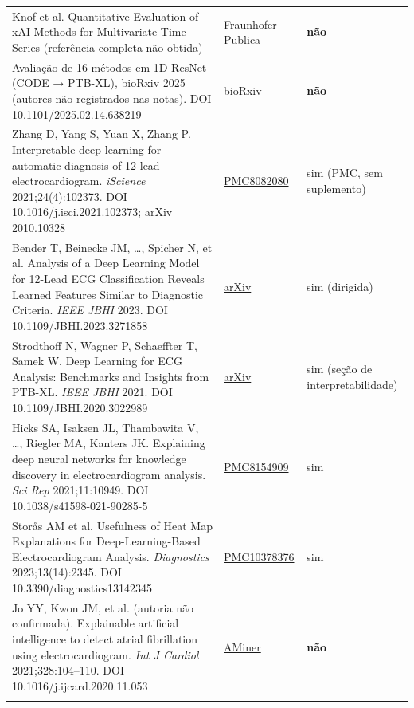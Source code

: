 \documentclass[11pt,a4paper]{article}
\begin{document}
{\begin{xltabular}{\linewidth}{>{\raggedright\arraybackslash}X>{\raggedright\arraybackslash}X>{\raggedright\arraybackslash}X}
Knof et al. Quantitative Evaluation of xAI Methods for Multivariate Time Series (referência completa não obtida) & \href{https://publica.fraunhofer.de/handle/publica/472815}{Fraunhofer Publica} & \textbf{não} \\ \addlinespace[1pt]
Avaliação de 16 métodos em 1D-ResNet (CODE → PTB-XL), bioRxiv 2025 (autores não registrados nas notas). DOI 10.1101/2025.02.14.638219 & \href{https://doi.org/10.1101/2025.02.14.638219}{bioRxiv} & \textbf{não} \\ \addlinespace[1pt]
Zhang D, Yang S, Yuan X, Zhang P. Interpretable deep learning for automatic diagnosis of 12-lead electrocardiogram. \textit{iScience} 2021;24(4):102373. DOI 10.1016/j.isci.2021.102373; arXiv 2010.10328 & \href{https://pmc.ncbi.nlm.nih.gov/articles/PMC8082080}{PMC8082080} & sim (PMC, sem suplemento) \\ \addlinespace[1pt]
Bender T, Beinecke JM, …, Spicher N, et al. Analysis of a Deep Learning Model for 12-Lead ECG Classification Reveals Learned Features Similar to Diagnostic Criteria. \textit{IEEE JBHI} 2023. DOI 10.1109/JBHI.2023.3271858 & \href{https://arxiv.org/pdf/2211.01738}{arXiv} & sim (dirigida) \\ \addlinespace[1pt]
Strodthoff N, Wagner P, Schaeffter T, Samek W. Deep Learning for ECG Analysis: Benchmarks and Insights from PTB-XL. \textit{IEEE JBHI} 2021. DOI 10.1109/JBHI.2020.3022989 & \href{https://arxiv.org/pdf/2004.13701}{arXiv} & sim (seção de interpretabilidade) \\ \addlinespace[1pt]
Hicks SA, Isaksen JL, Thambawita V, …, Riegler MA, Kanters JK. Explaining deep neural networks for knowledge discovery in electrocardiogram analysis. \textit{Sci Rep} 2021;11:10949. DOI 10.1038/s41598-021-90285-5 & \href{https://pmc.ncbi.nlm.nih.gov/articles/PMC8154909/}{PMC8154909} & sim \\ \addlinespace[1pt]
Storås AM et al. Usefulness of Heat Map Explanations for Deep-Learning-Based Electrocardiogram Analysis. \textit{Diagnostics} 2023;13(14):2345. DOI 10.3390/diagnostics13142345 & \href{https://pmc.ncbi.nlm.nih.gov/articles/PMC10378376/}{PMC10378376} & sim \\ \addlinespace[1pt]
Jo YY, Kwon JM, et al. (autoria não confirmada). Explainable artificial intelligence to detect atrial fibrillation using electrocardiogram. \textit{Int J Cardiol} 2021;328:104–110. DOI 10.1016/j.ijcard.2020.11.053 & \href{https://www.aminer.org/pub/5fcb5b25d4150a363cc9762f/explainable-artificial-intelligence-to-detect-atrial-fibrillation-using-electrocardiogram}{AMiner} & \textbf{não} \\ \addlinespace[1pt]

\end{xltabular}}
\end{document}
